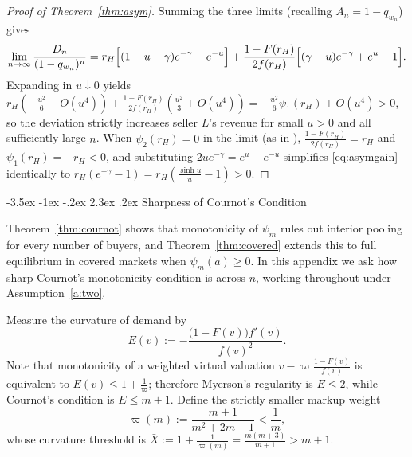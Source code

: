 \documentclass[12pt]{article}
\makeatletter
\newcommand{\citeasnoun}[1]{\citet{#1}}
\theoremstyle{mystyle}
\theoremstyle{mystyle2}
\newcommand{\mmpfont}{\scshape}
\renewcommand\section{\@startsection {section}{1}{\z@}%
                                   {-3.5ex \@plus -1ex \@minus -.2ex}%
                                   {2.3ex \@plus .2ex}%
                                   {\normalfont\large\mmpfont}}
\newcommand{\1}{\mathbf{1}}
\makeatother
\begin{document}
\begin{proof}[Proof of Theorem~\ref{thm:asym}]
Summing the three limits (recalling $A_n=1-q_{w_n}$) gives
\begin{equation}\label{eq:asymgain}
\lim_{n\to\infty}\frac{D_n}{(1-q_{w_n})^n} = r_H\Bigl[(1-u-\gamma)e^{-\gamma}-e^{-u}\Bigr] + \frac{1-F(r_H)}{2f(r_H)}\Bigl[(\gamma-u)e^{-\gamma}+e^u-1\Bigr].
\end{equation}
Expanding in $u\downarrow 0$ yields $r_H(-\frac{u^2}{6}+O(u^4))+\frac{1-F(r_H)}{2f(r_H)}(\frac{u^2}{3}+O(u^4))=-\frac{u^2}{6}\psi_1(r_H)+O(u^4)>0$, so the deviation strictly increases seller $L$'s revenue for small $u>0$ and all sufficiently large $n$. When $\psi_2(r_H)=0$ in the limit (as in \citeasnoun{he2026}), $\frac{1-F(r_H)}{2f(r_H)}=r_H$ and $\psi_1(r_H)=-r_H<0$, and substituting $2u e^{-\gamma}=e^u-e^{-u}$ simplifies \eqref{eq:asymgain} identically to $r_H(e^{-\gamma}-1)=r_H(\frac{\sinh u}{u}-1)>0$.
\end{proof}

\section{Sharpness of Cournot's Condition} \label{app:sharp}

Theorem~\ref{thm:cournot} shows that monotonicity of $\psi_m$ rules out interior pooling for every number of buyers, and Theorem~\ref{thm:covered} extends this to full equilibrium in covered markets when $\psi_m(a)\ge 0$. In this appendix we ask how sharp Cournot's monotonicity condition is across $n$, working throughout under Assumption~\ref{a:two}.

Measure the curvature of demand by
\[
E(v) := -\frac{\bigl(1-F(v)\bigr)f'(v)}{f(v)^2}.
\]
Note that monotonicity of a weighted virtual valuation $v-\varpi\frac{1-F(v)}{f(v)}$ is equivalent to $E(v)\le 1+\frac{1}{\varpi}$; therefore Myerson's regularity is $E\le 2$, while Cournot's condition is $E\le m+1$. Define the strictly smaller markup weight
\[
\varpi(m) := \frac{m+1}{m^2+2m-1} < \frac{1}{m},
\]
whose curvature threshold is $\bar X:=1+\frac{1}{\varpi(m)}=\frac{m(m+3)}{m+1}>m+1$.
\end{document}
